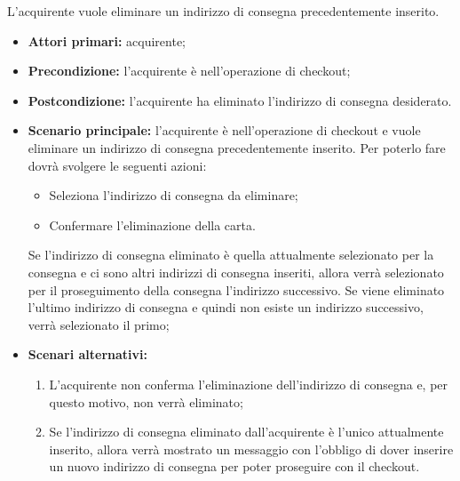 
\label{eliminazione-indirizzo-consegna}

L'acquirente vuole eliminare un indirizzo di consegna precedentemente inserito.
\begin{itemize}
    \item \textbf{Attori primari:} acquirente;
    \item \textbf{Precondizione:}  l'acquirente è nell'operazione di checkout;
    \item \textbf{Postcondizione:} l'acquirente ha eliminato l'indirizzo di consegna desiderato.
    \item \textbf{Scenario principale:} l'acquirente è nell'operazione di checkout e vuole eliminare un indirizzo di consegna precedentemente inserito. Per poterlo fare dovrà svolgere le seguenti azioni:
    \begin{itemize}
        \item Seleziona l'indirizzo di consegna da eliminare;
        \item Confermare l'eliminazione della carta.
    \end{itemize}
    Se l'indirizzo di consegna eliminato è quella attualmente selezionato per la consegna e ci sono altri indirizzi di consegna inseriti, allora verrà selezionato per il proseguimento della consegna l'indirizzo successivo. Se viene eliminato l'ultimo indirizzo di consegna e quindi non esiste un indirizzo successivo, verrà selezionato il primo;
    \item \textbf{Scenari alternativi:}
    \begin{enumerate}[label=\lett]
        \item L'acquirente non conferma l'eliminazione dell'indirizzo di consegna e, per questo motivo, non verrà eliminato;
        \item Se l'indirizzo di consegna eliminato dall'acquirente è l'unico attualmente inserito, allora verrà mostrato un messaggio con l'obbligo di dover inserire un nuovo indirizzo di consegna per poter proseguire con il checkout.
    \end{enumerate}
\end{itemize}

